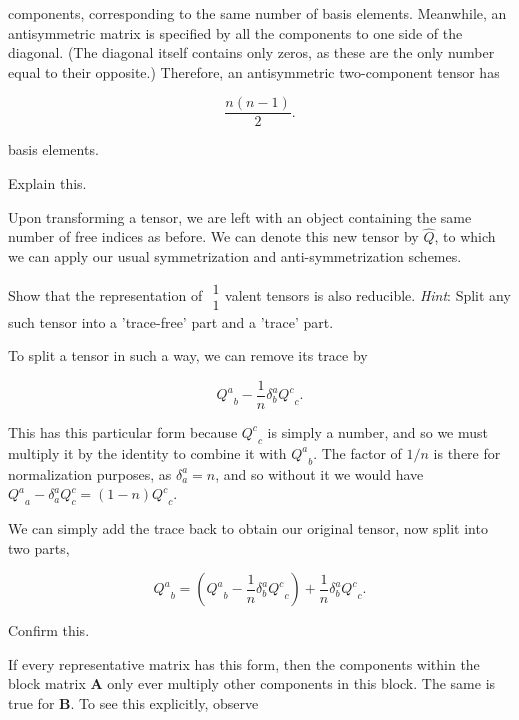 \documentclass[../the-road-to-reality.tex]{subfiles}
\begin{document}
\begin{questions}
\begin{solution}
        components, corresponding to the same number of basis elements. Meanwhile, an antisymmetric matrix is specified by all the components to one side of the diagonal. (The diagonal itself contains only zeros, as these are the only number equal to their opposite.) Therefore, an antisymmetric two-component tensor has

	\[
        \frac{n(n-1)}{2}
	.\] 

        basis elements.
\end{solution}

\question Explain this.

\begin{solution}
        Upon transforming a tensor, we are left with an object containing the same number of free indices as before. We can denote this new tensor by $\hat{Q}$, to which we can apply our usual symmetrization and anti-symmetrization schemes. 
\end{solution}

\question Show that the representation of $\begin{matrix} 1 \\ 1 \end{matrix}$valent tensors is also reducible. \textit{Hint}: Split any such tensor into a 'trace-free' part and a 'trace' part.

\begin{solution}
        To split a tensor in such a way, we can remove its trace by

	\[
        {Q^a}_b - \frac{1}{n}\delta^a_b{Q^c}_c
	.\] 

        This has this particular form because ${Q^c}_c$ is simply a number, and so we must multiply it by the identity to combine it with ${Q^a}_b$. The factor of $1/n$ is there for normalization purposes, as $\delta^a_a = n$, and so without it we would have ${Q^a}_a - \delta^a_a{Q^c_c} = (1-n){Q^c}_c$.

        We can simply add the trace back to obtain our original tensor, now split into two parts,

	\[
        {Q^a}_b = ({Q^a}_b - \frac{1}{n}\delta^a_b{Q^c}_c) + \frac{1}{n}\delta^a_b{Q^c}_c
	.\] 
\end{solution}

\question Confirm this.

\begin{solution}
        If every representative matrix has this form, then the components within the block matrix $\mathbf{A}$ only ever multiply other components in this block. The same is true for $\mathbf{B}$. To see this explicitly, observe


\end{solution}
\end{questions}
\end{document}
